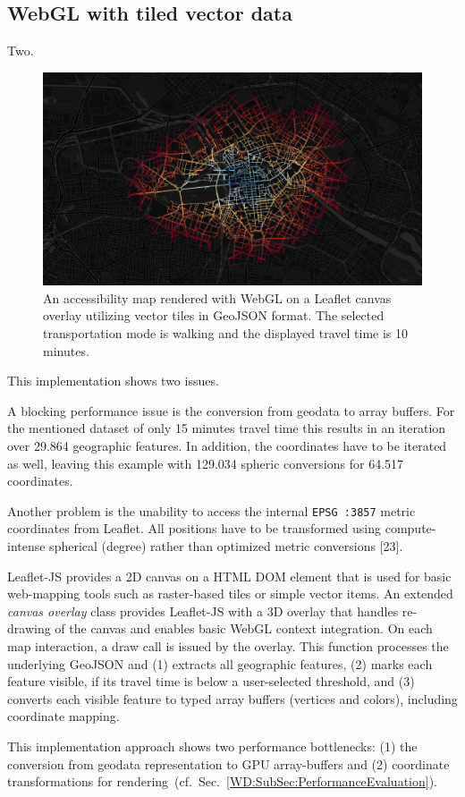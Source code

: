     \subsection{WebGL with tiled vector data}
      Two.
      \begin{figure}[h]
        \centering
        \includegraphics[width=0.7\linewidth]{./img/screenshot-poc2-600s-vector.png}
        \caption{An accessibility map rendered with WebGL on a Leaflet canvas overlay utilizing vector tiles in GeoJSON format. The selected transportation mode is walking and the displayed travel time is 10 minutes.}
        \label{fig:poc:two}
      \end{figure}
      This implementation shows two issues.\par
      A blocking performance issue is the conversion from geodata to array buffers. For the mentioned dataset of only 15 minutes travel time this results in an iteration over 29.864 geographic features. In addition, the coordinates have to be iterated as well, leaving this example with 129.034 spheric conversions for 64.517 coordinates.\par
      Another problem is the unability to access the internal \texttt{EPSG :3857} metric coordinates from Leaflet. All positions have to be transformed using compute-intense spherical (degree) rather than optimized metric conversions [23].\par
      Leaflet-JS provides a 2D canvas on a HTML DOM element that is used for basic
      web-mapping tools such as raster-based tiles or simple vector items. An extended
      \textsl{canvas overlay} class provides Leaflet-JS with a 3D overlay that handles
      re-drawing of the canvas and enables basic WebGL context integration. On each map
      interaction, a draw call is issued by the overlay. This function processes the
      underlying GeoJSON and (1) extracts all geographic features, (2) marks each feature
      visible, if its travel time is below a user-selected threshold, and (3) converts
      each visible feature to typed array buffers (vertices and colors), including coordinate mapping.\par
      This implementation approach shows two performance bottlenecks: (1) the conversion
      from geodata representation to GPU array-buffers and (2) coordinate transformations
      for rendering~(cf.~Sec.~\ref{WD:SubSec:PerformanceEvaluation}). \par
